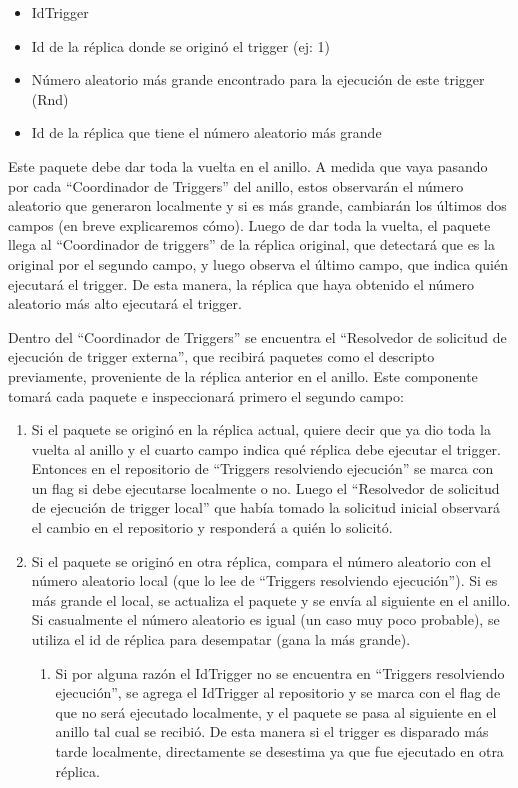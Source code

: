 \begin{itemize}
	\item IdTrigger
	\item Id de la réplica donde se originó el trigger (ej: 1)
	\item Número aleatorio más grande encontrado para la ejecución de este trigger (Rnd)
	\item Id de la réplica que tiene el número aleatorio más grande
\end{itemize}

Este paquete debe dar toda la vuelta en el anillo. A medida que vaya pasando por cada “Coordinador de Triggers” del anillo, estos observarán el número aleatorio que generaron localmente y si es más grande, cambiarán los últimos dos campos (en breve explicaremos cómo). Luego de dar toda la vuelta, el paquete llega al “Coordinador de triggers” de la réplica original, que detectará que es la original por el segundo campo, y luego observa el último campo, que indica quién ejecutará el trigger. De esta manera, la réplica que haya obtenido el número aleatorio más alto ejecutará el trigger.

Dentro del “Coordinador de Triggers” se encuentra el “Resolvedor de solicitud de ejecución de trigger externa”, que recibirá paquetes como el descripto previamente, proveniente de la réplica anterior en el anillo. Este componente tomará cada paquete e inspeccionará primero el segundo campo:

\begin{enumerate}
	\item Si el paquete se originó en la réplica actual, quiere decir que ya dio toda la vuelta al anillo y el cuarto campo indica qué réplica debe ejecutar el trigger. Entonces en el repositorio de “Triggers resolviendo ejecución” se marca con un flag si debe ejecutarse localmente o no. Luego el “Resolvedor de solicitud de ejecución de trigger local” que había tomado la solicitud inicial observará el cambio en el repositorio y responderá a quién lo solicitó.

	\item Si el paquete se originó en otra réplica, compara el número aleatorio con el número aleatorio local (que lo lee de “Triggers resolviendo ejecución”). Si es más grande el local, se actualiza el paquete y se envía al siguiente en el anillo. Si casualmente el número aleatorio es igual (un caso muy poco probable), se utiliza el id de réplica para desempatar (gana la más grande).

\begin{enumerate}
		\item Si por alguna razón el IdTrigger no se encuentra en “Triggers resolviendo ejecución”, se agrega el IdTrigger al repositorio y se marca con el flag de que no será ejecutado localmente, y el paquete se pasa al siguiente en el anillo tal cual se recibió. De esta manera si el trigger es disparado más tarde localmente, directamente se desestima ya que fue ejecutado en otra réplica.
\end{enumerate}
\end{enumerate}



